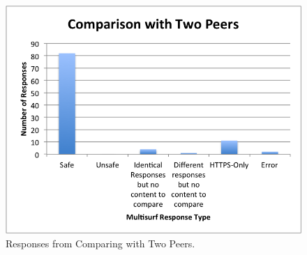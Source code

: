 \begin{figure}[htb]
\label{fig:peers}
\begin{center}
\includegraphics[width=\linewidth]{twopeers}
\caption{Responses from Comparing with Two Peers.}
\end{center}
\end{figure}
